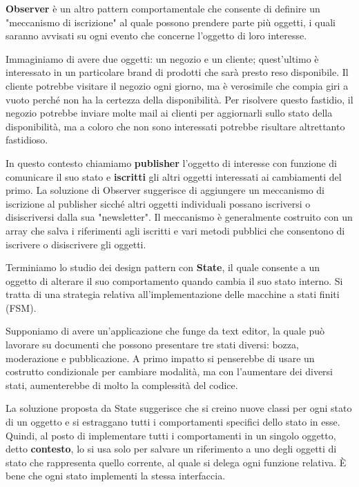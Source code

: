 \noindent \textbf{Observer} è un altro pattern comportamentale che consente di definire un "meccanismo di iscrizione" al quale possono prendere parte
più oggetti, i quali saranno avvisati su ogni evento che concerne l'oggetto di loro interesse.\par
Immaginiamo di avere due oggetti: un negozio e un cliente; quest'ultimo è interessato in un particolare brand di prodotti che sarà presto reso
disponibile. Il cliente potrebbe visitare il negozio ogni giorno, ma è verosimile che compia giri a vuoto perché non ha la certezza della disponibilità.
Per risolvere questo fastidio, il negozio potrebbe inviare molte mail ai clienti per aggiornarli sullo stato della disponibilità, ma a coloro che non
sono interessati potrebbe risultare altrettanto fastidioso.\par
In questo contesto chiamiamo \textbf{publisher} l'oggetto di interesse con funzione di comunicare il suo stato e \textbf{iscritti} gli altri oggetti
interessati ai cambiamenti del primo. La soluzione di Observer suggerisce di aggiungere un meccanismo di iscrizione al publisher sicché altri oggetti
individuali possano iscriversi o disiscriversi dalla sua "newsletter". Il meccanismo è generalmente costruito con un array che salva i riferimenti agli
iscritti e vari metodi pubblici che consentono di iscrivere o disiscrivere gli oggetti.\newline

\noindent Terminiamo lo studio dei design pattern con \textbf{State}, il quale consente a un oggetto di alterare il suo comportamento quando cambia il
suo stato interno. Si tratta di una strategia relativa all'implementazione delle macchine a stati finiti (FSM).\par
Supponiamo di avere un'applicazione che funge da text editor, la quale può lavorare su documenti che possono presentare tre stati diversi: bozza,
moderazione e pubblicazione. A primo impatto si penserebbe di usare un costrutto condizionale per cambiare modalità, ma con l'aumentare dei diversi
stati, aumenterebbe di molto la complessità del codice.\par
La soluzione proposta da State suggerisce che si creino nuove classi per ogni stato di un oggetto e si estraggano tutti i comportamenti specifici dello
stato in esse. Quindi, al posto di implementare tutti i comportamenti in un singolo oggetto, detto \textbf{contesto}, lo si usa solo per salvare un
riferimento a uno degli oggetti di stato che rappresenta quello corrente, al quale si delega ogni funzione relativa. È bene che ogni stato implementi
la stessa interfaccia.